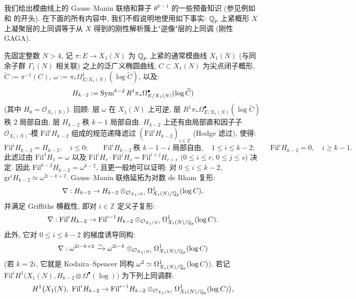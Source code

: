 \subsection{\mbox{}}\label{sec:4.2}

我们给出模曲线上的 Gauss--Manin 联络和算子 $\theta^{k-1}$ 的一些预备知识 (参见例如 \cite{ref:13} 和 \cite{ref:12} 的开头).
在下面的所有内容中, 我们不假说明地使用如下事实: $\mathbb{Q}_p$ 上紧概形 $X$ 上凝聚层的上同调等于从 $X$ 得到的刚性解析簇上"逆像"层的上同调 (刚性 GAGA).

先固定整数 $N > 4$, 记 $\pi : E \to X_1(N)$ 为 $\mathbb{Q}_p$ 上紧的通常模曲线 $X_1(N)$ (与同余子群 $\Gamma_1(N)$ 相关联) 之上的泛广义椭圆曲线, $C \subset X_1(N)$ 为尖点闭子概形, $\widetilde{C} := \pi^{-1}(C)$, $\omega := \pi_{*}\Omega^{1}_{E/X_1(N)}(\log \widetilde{C})$, 以及:
\[
H_{k-2} := \operatorname{Sym}^{k-2}R^{1}\pi_{*}\Omega^{\bullet}_{E/X_1(N)}(\log \widetilde{C})
\]
(其中 $H_0 = \mathcal{O}_{X_1(N)}$).
回顾: 层 $\omega$ 在 $X_1(N)$ 上可逆, 层 $R^{1}\pi_{*}\Omega^{\bullet}_{E/X_1(N)}(\log \widetilde{C})$ 秩 $2$ 局部自由, 层 $H_{k-2}$ 秩 $k-1$ 局部自由.
$H_{k-2}$ 上还有由局部直和因子子 $\mathcal{O}_{X_1(N)}$-模 $\mathrm{Fil}^{i}H_{k-2}$ 组成的规范递降滤过 $(\mathrm{Fil}^{i}H_{k-2})_{i \in \mathbb{Z}}$ (Hodge 滤过), 使得:
\[
\mathrm{Fil}^{i}H_{k-2} = H_{k-2},\quad i \le 0;
\qquad
\mathrm{Fil}^{i}H_{k-2}\ \text{秩 } k-1-i \text{ 局部自由},\quad 1 \le i \le k-2;
\qquad
\mathrm{Fil}^{i}H_{k-2} = 0,\quad i \ge k-1.
\]
此滤过由 $\mathrm{Fil}^{1}H_1 = \omega$ 以及 $\mathrm{Fil}^{i}H_r \cdot \mathrm{Fil}^{j}H_s = \mathrm{Fil}^{i+j}H_{r+s}$ ($0 \le i \le r$, $0 \le j \le s$) 决定.
因此 $\mathrm{Fil}^{k-2}H_{k-2} = \omega^{k-2}$, 且更一般地可以证明: 对 $0 \le i \le k-2$, $\mathrm{gr}^{i}H_{k-2} \simeq \omega^{2i-k+2}$.
Gauss--Manin 联络延拓为对数 de Rham 复形:
\[
\nabla : H_{k-2} \to H_{k-2} \otimes_{\mathcal{O}_{X_1(N)}} \Omega^{1}_{X_1(N)/\mathbb{Q}_p}(\log C),
\]
并满足 Griffiths 横截性, 即对 $i \in \mathbb{Z}$ 定义子复形:
\[
\nabla : \mathrm{Fil}^{i}H_{k-2} \to \mathrm{Fil}^{i-1}H_{k-2} \otimes_{\mathcal{O}_{X_1(N)}} \Omega^{1}_{X_1(N)/\mathbb{Q}_p}(\log C).
\]
此外, 它对 $0 \le i \le k-2$ 的梯度诱导同构:
\begin{equation}
\label{eq:17}
\nabla : \omega^{2i-k+2} \xrightarrow{\sim} \omega^{2i-k} \otimes_{\mathcal{O}_{X_1(N)}} \Omega^{1}_{X_1(N)/\mathbb{Q}_p}(\log C)
\end{equation}
(若 $k = 2i$, 它就是 Kodaira--Spencer 同构 $\omega^{2} \simeq \Omega^{1}_{X_1(N)/\mathbb{Q}_p}(\log C)$).
若记 $\mathrm{Fil}^{i}H^{1}\bigl(X_1(N),H_{k-2} \otimes \Omega^{\bullet}(\log)\bigr)$ 为下列上同调群:
\[
H^{1}\bigl(X_1(N),\ \mathrm{Fil}^{i}H_{k-2} \to \mathrm{Fil}^{i-1}H_{k-2} \otimes_{\mathcal{O}_{X_1(N)}} \Omega^{1}_{X_1(N)/\Qp}(\log C)\bigr),
\]
